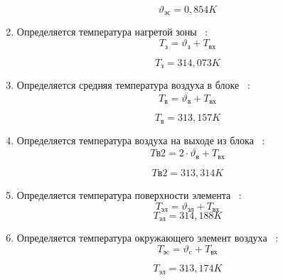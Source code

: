 \begin{enumerate}[label={\arabic*.}]
  $$\vartheta\mathrm{_{эс}} = 0,854 K$$

\item Определяется температура нагретой зоны ~\cite{Rotkop1976}:
  \begin{equation}
    T\mathrm{_{з}} = \vartheta\mathrm{_{з}} + T\mathrm{_{вх}}
  \end{equation}

  $$T\mathrm{_{з}} = 314,073K$$
  
\item Определяется средняя температура воздуха в блоке ~\cite{Rotkop1976}:
  \begin{equation}
    T\mathrm{_{в}} = \overline{\vartheta\mathrm{_{в}}} + T\mathrm{_{вх}}
  \end{equation}
  
  $$ T\mathrm{_{в}} = 313,157K$$
 
\item Определяется температура воздуха на выходе из
  блока ~\cite{Rotkop1976}:
  \begin{equation}
    T\mathrm{в2} = 2\cdot \overline{\vartheta\mathrm{_{в}}} + T\mathrm{_{вх}}
  \end{equation}
  
  $$ T\mathrm{в2} = 313,314K$$
  
\item Определяется температура поверхности элемента ~\cite{Rotkop1976}:
  \begin{equation}
    T\mathrm{_{эл}} = \vartheta\mathrm{_{эл}}  + T\mathrm{_{вх}}
  \end{equation}
  $$    T\mathrm{_{эл}} = 314,188K$$
  
\item Определяется температура окружающего
  элемент воздуха ~\cite{Rotkop1976}:
  \begin{equation}
        T\mathrm{_{эc}} = \vartheta\mathrm{_{c}} + T\mathrm{_{вх}}
    \end{equation}

 $$    T\mathrm{_{эл}} = 313,174K$$

  
\end{enumerate}
\newpage %
